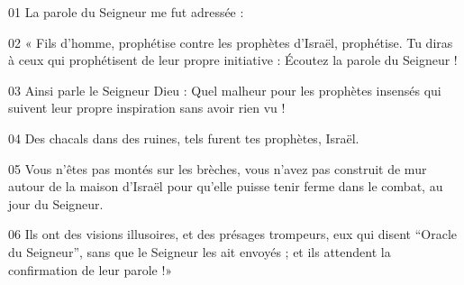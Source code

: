 01 La parole du Seigneur me fut adressée :

02 « Fils d’homme, prophétise contre les prophètes d’Israël, prophétise. Tu diras à ceux qui prophétisent de leur propre initiative : Écoutez la parole du Seigneur !

03 Ainsi parle le Seigneur Dieu : Quel malheur pour les prophètes insensés qui suivent leur propre inspiration sans avoir rien vu !

04 Des chacals dans des ruines, tels furent tes prophètes, Israël.

05 Vous n’êtes pas montés sur les brèches, vous n’avez pas construit de mur autour de la maison d’Israël pour qu’elle puisse tenir ferme dans le combat, au jour du Seigneur.

06 Ils ont des visions illusoires, et des présages trompeurs, eux qui disent “Oracle du Seigneur”, sans que le Seigneur les ait envoyés ; et ils attendent la confirmation de leur parole !»
